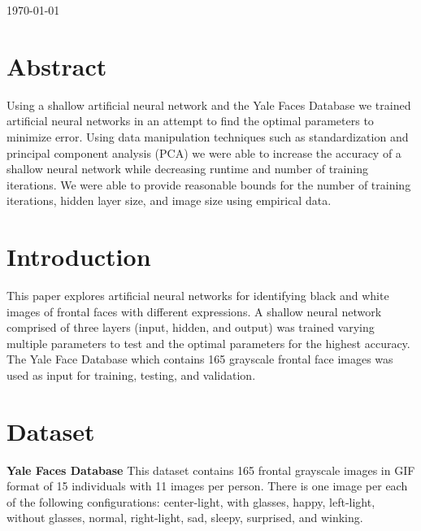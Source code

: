 \documentclass[12pt]{article}
\begin{document}
\begin{titlepage}

{\large \today}\\[3cm] %




\vfill %
\end{titlepage}

\newpage

\section{Abstract}
Using a shallow artificial neural network and the Yale Faces Database we trained artificial neural networks in an attempt to find the optimal parameters to minimize error. Using data manipulation techniques such as standardization and principal component analysis (PCA) we were able to increase the accuracy of a shallow neural network while decreasing runtime and number of training iterations. We were able to provide reasonable bounds for the number of training iterations, hidden layer size, and image size using empirical data.


\section{Introduction}
This paper explores artificial neural networks for identifying black and white images of frontal faces with different expressions. A shallow neural network comprised of three layers (input, hidden, and output) was trained varying multiple parameters to test and the optimal parameters for the highest accuracy. The Yale Face Database which contains 165 grayscale frontal face images was used as input for training, testing, and validation.


\section{Dataset}
\textbf{Yale Faces Database} \quad This dataset contains 165 frontal grayscale images in GIF format of 15 individuals with 11 images per person. There is one image per each of the following configurations: center-light, with glasses, happy, left-light, without glasses, normal, right-light, sad, sleepy, surprised, and winking.
\end{document}
